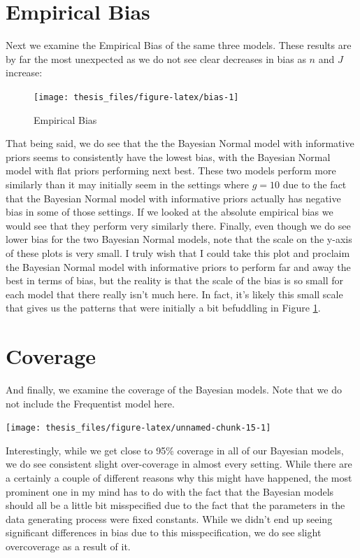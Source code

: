 \documentclass[12pt,twoside]{reedthesis}
\begin{document}
\hypertarget{empirical-bias}{%
\section{Empirical Bias}\label{empirical-bias}}

Next we examine the Empirical Bias of the same three models. These results are by far the most unexpected as we do not see clear decreases in bias as \(n\) and \(J\) increase:
\begin{figure}

{\centering \texttt{[image: thesis\_files/figure-latex/bias-1]} 

}

\caption{Empirical Bias}\label{fig:bias}
\end{figure}
That being said, we do see that the the Bayesian Normal model with informative priors seems to consistently have the lowest bias, with the Bayesian Normal model with flat priors performing next best. These two models perform more similarly than it may initially seem in the settings where \(g = 10\) due to the fact that the Bayesian Normal model with informative priors actually has negative bias in some of those settings. If we looked at the absolute empirical bias we would see that they perform very similarly there. Finally, even though we do see lower bias for the two Bayesian Normal models, note that the scale on the y-axis of these plots is very small. I truly wish that I could take this plot and proclaim the Bayesian Normal model with informative priors to perform far and away the best in terms of bias, but the reality is that the scale of the bias is so small for each model that there really isn't much here. In fact, it's likely this small scale that gives us the patterns that were initially a bit befuddling in Figure \ref{fig:bias}.

\hypertarget{coverage}{%
\section{Coverage}\label{coverage}}

And finally, we examine the coverage of the Bayesian models. Note that we do not include the Frequentist model here.
\begin{center}\texttt{[image: thesis\_files/figure-latex/unnamed-chunk-15-1]} \end{center}

Interestingly, while we get close to 95\% coverage in all of our Bayesian models, we do see consistent slight over-coverage in almost every setting. While there are a certainly a couple of different reasons why this might have happened, the most prominent one in my mind has to do with the fact that the Bayesian models should all be a little bit misspecified due to the fact that the parameters in the data generating process were fixed constants. While we didn't end up seeing significant differences in bias due to this misspecification, we do see slight overcoverage as a result of it.
\end{document}
